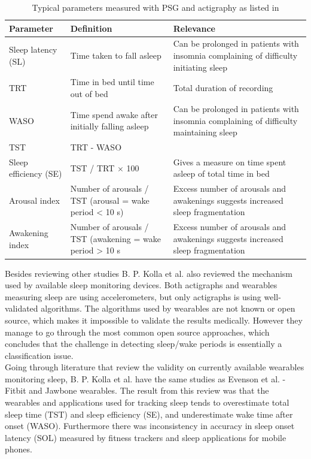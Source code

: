 \documentclass[12pt]{article} %
\begin{document}
\begin{table}[H]
\center
\begin{footnotesize}
	\begin{tabular}{|p{3.2cm} |p{4.6cm} |p{6.5cm} |}
	\hline
	\textbf{Parameter} & \textbf{Definition} & \textbf{Relevance}\\
	\hline
	Sleep latency (SL) & Time taken to fall asleep & Can be prolonged in patients with insomnia complaining of difficulty initiating sleep \\
	\hline
	TRT & Time in bed until time out of bed & Total duration of recording\\
	\hline
	WASO & Time spend awake after initially falling asleep & Can be prolonged in patients with insomnia complaining of difficulty maintaining sleep \\
	\hline
	TST & TRT - WASO & \\
	\hline
	Sleep efficiency (SE) & TST / TRT $\times$ 100 & Gives a measure on time spent asleep of total time in bed \\
	\hline
	Arousal index & Number of arousals / TST (arousal = wake period < 10 s) & Excess number of arousals and awakenings suggests increased sleep fragmentation\\ 
	\hline
	Awakening index & Number of arousals / TST (awakening = wake period > 10 s & Excess number of arousals and awakenings suggests increased sleep fragmentation \\
	\hline
	\end{tabular}
	\caption{Typical parameters measured with PSG and actigraphy as listed in \cite{consumer}}
	\label{tab:psgparameters}
\end{footnotesize}
\end{table}

Besides reviewing other studies B. P. Kolla et al. also reviewed the mechanism used by available sleep monitoring devices. Both actigraphs and wearables measuring sleep are using accelerometers, but only actigraphs is using well-validated algorithms. The algorithms used by wearables are not known or open source, which makes it impossible to validate the results medically. However they manage to go through the most common open source approaches, which concludes that the challenge in detecting sleep/wake periods is essentially a classification issue. \\

Going through literature that review the validity on currently available wearables monitoring sleep, B. P. Kolla et al. have the same studies as Evenson et al. - Fitbit and Jawbone wearables. The result from this review was that the wearables and applications used for tracking sleep tends to overestimate total sleep time (TST) and sleep efficiency (SE), and underestimate wake time after onset (WASO). Furthermore there was inconsistency in accuracy in sleep onset latency (SOL) measured by fitness trackers and sleep applications for mobile phones.\\
\end{document}
